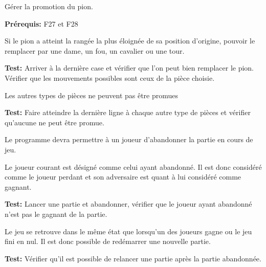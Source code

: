 \documentclass{article}
\begin{document}
\begin{needbox}
    Gérer la promotion du pion.

    \textbf{Prérequis:} F27 et F28
    \begin{subneedbox}
        Si le pion a atteint la rangée la plus éloignée de sa position d'origine, pouvoir le remplacer par
        une dame, un fou, un cavalier ou une tour.

        \textbf{Test:} Arriver à la dernière case et vérifier que l'on peut bien remplacer le pion. 
        Vérifier que les mouvements possibles sont ceux de la pièce choisie.
    \end{subneedbox}
    \begin{subneedbox}
        Les autres types de pièces ne peuvent pas être promues

        \textbf{Test:} Faire atteindre la dernière ligne à chaque autre type de pièces
         et vérifier qu'aucune ne peut être promue.
    \end{subneedbox}
\end{needbox}

\begin{needbox}
    Le programme devra permettre à un joueur d'abandonner la partie en cours de jeu.
    \begin{subneedbox}[F32.1: Gagnant]
        Le joueur courant est désigné comme celui ayant abandonné.
        Il est donc considéré comme le joueur perdant et son adversaire
        est quant à lui considéré comme gagnant.

        \textbf{Test:} Lancer une partie et abandonner, vérifier que le joueur ayant
        abandonné n'est pas le gagnant de la partie.
    \end{subneedbox}
    \begin{subneedbox}
        Le jeu se retrouve dans le même état que lorsqu'un des joueurs
        gagne ou le jeu fini en nul. Il est donc possible de redémarrer
        une nouvelle partie.

        \textbf{Test:} Vérifier qu'il est possible de relancer une partie après
        la partie abandonnée.
    \end{subneedbox}
\end{needbox}
\end{document}
